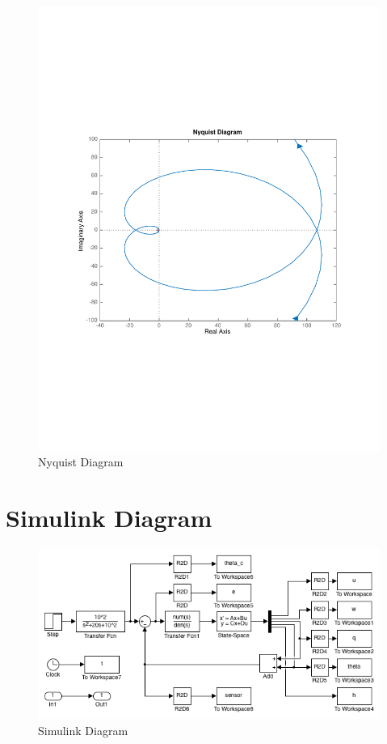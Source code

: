 \documentclass[12pt]{article}
\begin{document}
\begin{figure}[h]
\begin{center}
\includegraphics[width=1\textwidth]{figures/nyquist}
\caption{Nyquist Diagram}
\end{center}
\end{figure}

\clearpage
\section{Simulink Diagram}
\begin{figure}[h]
\begin{center}
\includegraphics[width=1\textwidth]{figures/simulink}
\caption{Simulink Diagram}
\end{center}
\end{figure}
\end{document}
